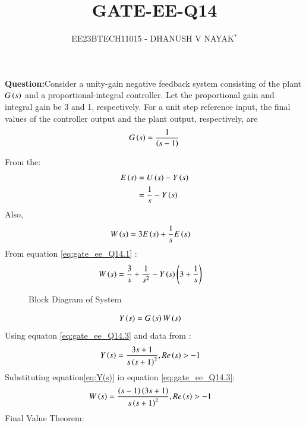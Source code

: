 \documentclass[journal,12pt,twocolumn]{IEEEtran}
\theoremstyle{remark}
\begin{document}

\title{GATE-EE-Q14}
\author{EE23BTECH11015 - DHANUSH V NAYAK$^{*}$%
}
\maketitle
\newpage
\bigskip
\renewcommand{\thefigure}{\arabic{figure}}
\renewcommand{\thetable}{\theenumi}
\textbf{Question:}Consider a unity-gain negative feedback system consisting of the plant $G\left(s\right)$  and a proportional-integral controller. Let the proportional gain and integral
gain be 3 and 1, respectively. For a unit step reference input, the final values of the
controller output and the plant output, respectively, are
\begin{align}
    G\left(s\right) = \frac{1}{\left(s-1\right)} \notag
\end{align}
\solution 

From the:
\begin{align}
    E\left(s\right)&= U\left(s\right) - Y\left(s\right)\\
             &= \frac{1}{s} - Y\left(s\right)\label{eq:gate_ee_Q14.1}
\end{align}
Also,
\begin{align}
    W\left(s\right) &= 3E\left(s\right) + \frac{1}{s}E\left(s\right)\label{eq:gate_ee_Q14.2}
\end{align}
From equation \eqref{eq:gate_ee_Q14.1} :
\begin{align}
    W\left(s\right) &= \frac{3}{s} + \frac{1}{s^2} - Y\left(s\right)\left(3+\frac{1}{s}\right)\label{eq:gate_ee_Q14.3}
\end{align}
\begin{figure}[H]
    \resizebox{0.55\textwidth}{!}{}
    \caption{Block Diagram of System}
    \label{fig:gate_ee_Q14_blockdiagram}
\end{figure}
\begin{align}
    Y\left(s\right) &= G\left(s\right)W\left(s\right)
\end{align}
Using equaton   \eqref{eq:gate_ee_Q14.3} and data from :
\begin{align}
    Y\left(s\right) &=  \frac{3s+1}{s\left(s+1\right)^2} ,  Re\left(s\right)>-1 \label{eq:Y(s)}
\end{align}
Substituting equation\eqref{eq:Y(s)} in equation \eqref{eq:gate_ee_Q14.3}:
\begin{align}
    W\left(s\right) &= \frac{\left(s-1\right)\left(3s+1\right)}{s\left(s+1\right)^2} ,  Re\left(s\right)>-1 \label{eq:W(s)}
\end{align}
Final Value Theorem:    
\end{document}

